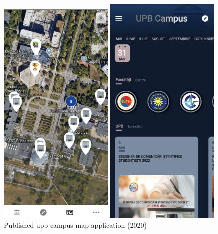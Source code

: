 \begin{figure}[!ht]
\begin{minipage}[b]{0.49\textwidth}
             \includegraphics[width=0.49\textwidth]{figures/navigation_apps/upb_campus_published2.png}
            \caption{Published \acrshort{upb} campus map application (2020)}
            \label{2:fig:upb_campus_published}
        \end{minipage}
        \hfill
        \begin{minipage}[b]{0.49\textwidth}
            \captionsetup{justification=centering}
             \includegraphics[width=0.49\textwidth]{figures/navigation_apps/upb_campus_new_published1.png}

\end{minipage}
\end{figure}
